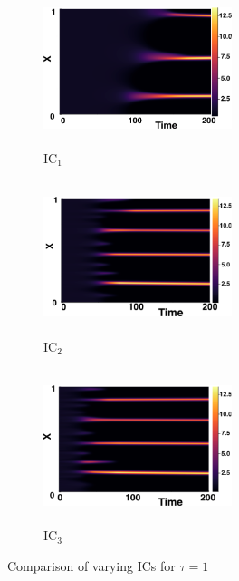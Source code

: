 \documentclass[12pt]{report}
\begin{document}
\begin{figure}[H]
    \centering
    \begin{subfigure}[b]{0.32\textwidth}
        \centering
        \includegraphics[width=5.5cm,height=4.5cm]{gaff1.png}
        \caption{$\text{IC}_1$}
        \label{}
    \end{subfigure}
    \hfill
    \begin{subfigure}[b]{0.32\textwidth}
        \centering
        \includegraphics[width=5.5cm,height=4.5cm]{ic21.png}
        \caption{$\text{IC}_2$}
        \label{}
    \end{subfigure}
    \hfill
    \begin{subfigure}[b]{0.32\textwidth}
        \centering
        \includegraphics[width=5.5cm,height=4.5cm]{ic31.png}
        \caption{$\text{IC}_3$}
        \label{}
    \end{subfigure}
    \caption{Comparison of varying ICs for $\tau=1$}
    \label{fig:figtau1}
\end{figure}
\end{document}
